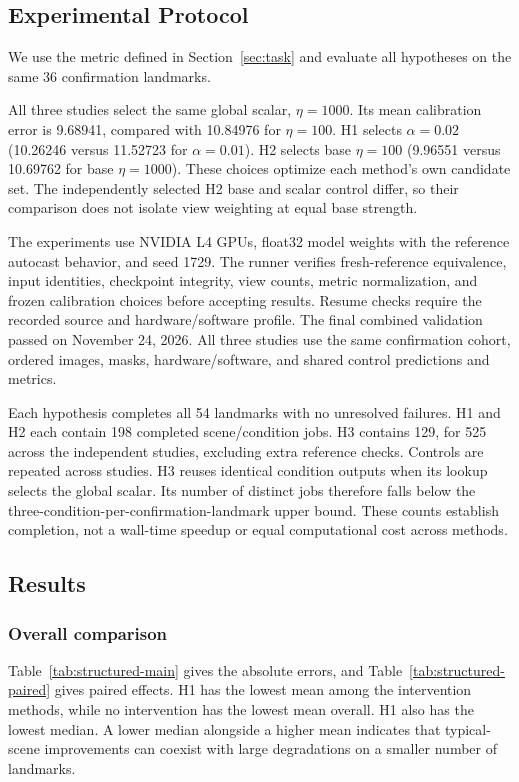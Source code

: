 \subsection{Experimental Protocol}
\label{sec:structured-evaluation}
We use the metric defined in Section~\ref{sec:task} and evaluate all hypotheses on the same 36 confirmation landmarks.

All three studies select the same global scalar, $\eta=1000$. Its mean calibration error is 9.68941, compared with 10.84976 for $\eta=100$. H1 selects $\alpha=0.02$ (10.26246 versus 11.52723 for $\alpha=0.01$). H2 selects base $\eta=100$ (9.96551 versus 10.69762 for base $\eta=1000$). These choices optimize each method's own candidate set. The independently selected H2 base and scalar control differ, so their comparison does not isolate view weighting at equal base strength.

The experiments use NVIDIA L4 GPUs, float32 model weights with the reference autocast behavior, and seed 1729. The runner verifies fresh-reference equivalence, input identities, checkpoint integrity, view counts, metric normalization, and frozen calibration choices before accepting results. Resume checks require the recorded source and hardware/software profile. The final combined validation passed on November 24, 2026. All three studies use the same confirmation cohort, ordered images, masks, hardware/software, and shared control predictions and metrics.

Each hypothesis completes all 54 landmarks with no unresolved failures. H1 and H2 each contain 198 completed scene/condition jobs. H3 contains 129, for 525 across the independent studies, excluding extra reference checks. Controls are repeated across studies. H3 reuses identical condition outputs when its lookup selects the global scalar. Its number of distinct jobs therefore falls below the three-condition-per-confirmation-landmark upper bound. These counts establish completion, not a wall-time speedup or equal computational cost across methods.

\subsection{Results}
\label{sec:structured-results}
\subsubsection{Overall comparison}
Table~\ref{tab:structured-main} gives the absolute errors, and Table~\ref{tab:structured-paired} gives paired effects. H1 has the lowest mean among the intervention methods, while no intervention has the lowest mean overall. H1 also has the lowest median. A lower median alongside a higher mean indicates that typical-scene improvements can coexist with large degradations on a smaller number of landmarks.

